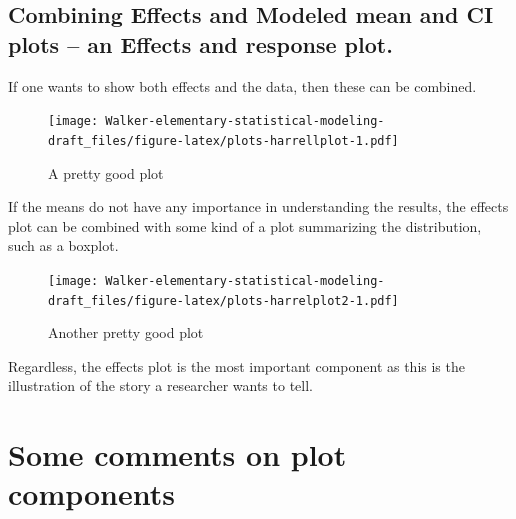 \documentclass[]{book}
\begin{document}
\subsection{Combining Effects and Modeled mean and CI plots -- an
Effects and response
plot.}\label{combining-effects-and-modeled-mean-and-ci-plots-an-effects-and-response-plot.}

If one wants to show both effects and the data, then these can be
combined.

\begin{figure}
\centering
\texttt{[image: Walker-elementary-statistical-modeling-draft\_files/figure-latex/plots-harrellplot-1.pdf]}
\caption{\label{fig:plots-harrellplot}A pretty good plot}
\end{figure}

If the means do not have any importance in understanding the results,
the effects plot can be combined with some kind of a plot summarizing
the distribution, such as a boxplot.

\begin{figure}
\centering
\texttt{[image: Walker-elementary-statistical-modeling-draft\_files/figure-latex/plots-harrelplot2-1.pdf]}
\caption{\label{fig:plots-harrelplot2}Another pretty good plot}
\end{figure}

Regardless, the effects plot is the most important component as this is
the illustration of the story a researcher wants to tell.

\section{Some comments on plot
components}\label{some-comments-on-plot-components}
\end{document}
